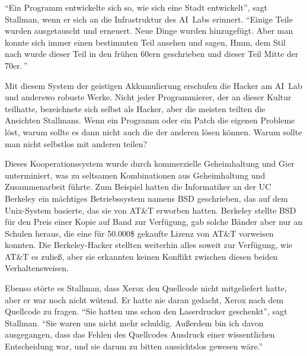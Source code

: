 "`Ein Programm entwickelte sich so, wie sich eine Stadt entwickelt"', sagt Stallman, wenn er sich an die Infrastruktur des AI~Labs erinnert. "`Einige Teile wurden ausgetauscht und erneuert. Neue Dinge wurden hinzugefügt. Aber man konnte sich immer einen bestimmten Teil ansehen und sagen, \glq Hmm, dem Stil nach wurde dieser Teil in den frühen 60ern geschrieben und dieser Teil Mitte der 70er.\grq\,"'

Mit diesem System der geistigen Akkumulierung erschufen die Hacker am AI~Lab und anderswo robuste Werke. Nicht jeder Programmierer, der an dieser Kultur teilhatte, bezeichnete sich selbst als Hacker, aber die meisten teilten die Ansichten Stallmans. Wenn ein Programm oder ein Patch die eigenen Probleme löst, warum sollte es dann nicht auch die der anderen lösen können. Warum sollte man nicht selbstlos mit anderen teilen?

Dieses Kooperationssystem wurde durch kommerzielle Geheimhaltung und Gier unterminiert, was zu seltsamen Kombinationen aus Geheimhaltung und Zusammenarbeit führte. Zum Beispiel hatten die Informatiker an der UC Berkeley ein mächtiges Betriebssystem namens BSD geschrieben, das auf dem Unix-System basierte, das sie von AT\&T erworben hatten. Berkeley stellte BSD für den Preis einer Kopie auf Band zur Verfügung, gab solche Bänder aber nur an Schulen heraus, die eine für 50.000\$ gekaufte Lizenz von AT\&T vorweisen konnten. Die Berkeley-Hacker stellten weiterhin alles soweit zur Verfügung, wie AT\&T es zuließ, aber sie erkannten keinen Konflikt zwischen diesen beiden Verhaltensweisen.

Ebenso störte es Stallman, dass Xerox den Quellcode nicht mitgeliefert hatte, aber er war noch nicht wütend. Er hatte nie daran gedacht, Xerox nach dem Quellcode zu fragen. "`Sie hatten uns schon den Laserdrucker geschenkt"', sagt Stallman. "`Sie waren uns nicht mehr schuldig. Außerdem bin ich davon ausgegangen, dass das Fehlen des Quellcodes Ausdruck einer wissentlichen Entscheidung war, und sie darum zu bitten aussichtslos gewesen wäre."' 

